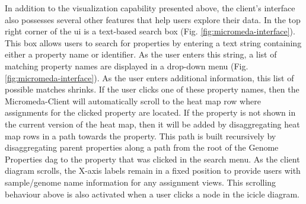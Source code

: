 In addition to the visualization capability presented above, the client's 
interface also possesses several other features that help users explore their 
data. In the top right corner of the \gls{ui} is a text-based search box (Fig. 
\ref{fig:micromeda-interface}). This box allows users to search for properties 
by entering a text string containing either a property name or identifier. As 
the user enters this string, a list of matching property names are displayed in 
a drop-down menu (Fig. \ref{fig:micromeda-interface}). As the user enters 
additional information, this list of possible matches shrinks. If the user 
clicks one of these property names, then the Micromeda-Client will automatically 
scroll to the heat map row where assignments for the clicked property are 
located. If the property is not shown in the current version of the heat map, 
then it will be added by disaggregating heat map rows in a path towards the 
property. This path is built recursively by disaggregating parent properties 
along a path from the root of the Genome Properties \gls{dag} to the property 
that was clicked in the search menu. As the client diagram scrolls, the X-axis 
labels remain in a fixed position to provide users with sample/genome name 
information for any assignment views. This scrolling behaviour above is also 
activated when a user clicks a node in the icicle diagram.

